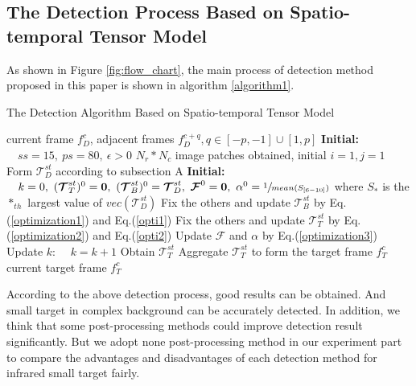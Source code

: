 \documentclass[journal]{IEEEtran}
\newcommand{\initial}{\textbf{Initial:}}
\begin{document}
\subsection{The Detection Process Based on Spatio-temporal Tensor Model}
As shown in Figure \ref{fig:flow_chart}, the main process of detection method proposed in this paper is shown in algorithm \ref{algorithm1}.
\begin{algorithm}[H]
  \caption{The Detection Algorithm Based on Spatio-temporal Tensor Model}
  \begin{algorithmic}[1]
    \Require
    current frame $f_D^c$, adjacent frames $f_D^{c+q},q\in \left [-p,-1 \right]\cup \left [1,p \right ]$
    \State
    \initial   $\quad ss=15,\ ps=80,\ \epsilon>0$
    \State $N_r*N_c$ image patches obtained, initial $i=1,j=1$
    \State Form $\bm{\mathcal T}_D^{st}$ according to subsection A 
    \State
    \initial   $\quad k=0,\ (\bm{\mathcal T}_T^{st})^{0}=\bm{0}, \ (\bm{\mathcal T}_B^{st})^{0}=\bm{\mathcal T}_D^{st}, \ \bm{\mathcal F}^0=\bm{0},\ \alpha^0=\sfrac{1}{mean(S_{[6-10]})}$ where $S_*$ is the $*_{th}$ largest value of $vec(\bm{\mathcal T}_D^{st})$
    \Repeat
    \State Fix the others and update $\bm{\mathcal T}_B^{st}$ by Eq.(\ref{optimization1}) and Eq.(\ref{opti1})
    \State Fix the others and update $\bm{\mathcal T}_T^{st}$ by Eq.(\ref{optimization2}) and Eq.(\ref{opti2})
    \State Update $\bm{\mathcal F}$ and $\alpha$ by Eq.(\ref{optimization3})
    \State Update $k$: $\quad k=k+1$
    \State Obtain $\bm{\mathcal T}_T^{st}$
    \EndWhile
    \State Aggregate $\bm{\mathcal T}_T^{st}$ to form the target frame $f_T^c$
    \Ensure
    current target frame $f_T^c$
  \end{algorithmic}
  \label{algorithm1}
\end{algorithm}

According to the above detection process, good results can be obtained. And small target in complex background can be accurately detected. In addition, we think that some post-processing methods could improve detection result significantly. But we adopt none post-processing method in our experiment part to compare the advantages and disadvantages of each detection method for infrared small target fairly.
\end{document}
